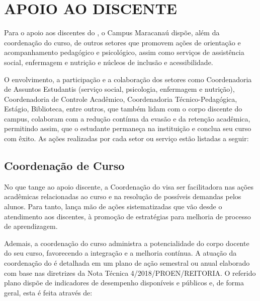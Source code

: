 \section{APOIO AO DISCENTE}\label{APOIO}

Para o apoio aos discentes do \NOMECURSO, o Campus Maracanaú dispõe, além da coordenação do curso, de outros setores que promovem ações de orientação e acompanhamento pedagógico e psicológico, assim como serviços de assistência social, enfermagem e nutrição e núcleos de inclusão e acessibilidade.

O envolvimento, a participação e a colaboração dos setores como Coordenadoria de Assuntos Estudantis (serviço social, psicologia, enfermagem e nutrição), Coordenadoria de Controle Acadêmico, Coordenadoria Técnico-Pedagógica, Estágio, Biblioteca, entre outros, que também lidam com o corpo discente do campus, colaboram com a redução contínua da evasão e da retenção acadêmica, permitindo assim, que o estudante permaneça na instituição e conclua seu curso com êxito. As ações realizadas por cada setor ou serviço estão listadas a seguir:

\subsection{Coordenação de Curso}
No que tange ao apoio discente, a Coordenação do \NOMECURSO visa ser facilitadora nas ações acadêmicas relacionadas ao curso e na resolução de possíveis demandas pelos alunos. Para tanto, lança mão de ações sistematizadas que vão desde o atendimento aos discentes, à promoção de estratégias para melhoria de processo de aprendizagem. 

Ademais, a coordenação do curso administra a potencialidade do corpo docente do seu curso, favorecendo a integração e a melhoria contínua. A atuação da coordenação do \NOMECURSO é detalhada em um plano de ação semestral ou anual elaborado com base nas diretrizes da Nota Técnica 4/2018/PROEN/REITORIA. O referido plano dispõe de indicadores de desempenho disponíveis e públicos e, de forma geral, esta é feita através de:

